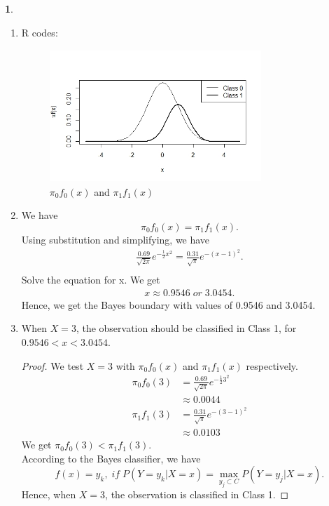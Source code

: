\documentclass[10pt]{article}
\newtheorem{prob}{\bm{$Problem$}}
\begin{document}
\begin{prob}
\end{prob}
\begin{enumerate}[1)]
\vspace{3mm}

\item
R codes:

\begin{figure}[H]
  \centering
  \includegraphics[width=8cm,height=5cm]{p21a.jpeg}
  \caption{$\pi_0f_0(x)$ and $\pi_1f_1(x)$} %
\end{figure}

\item
We have
\begin{equation}
\pi_0f_0(x)=\pi_1f_1(x).
\end{equation}
Using substitution and simplifying, we have
\begin{align*}
\frac{0.69}{\sqrt{2\pi}}e^{-\frac{1}{2}x^2}=\frac{0.31}{\sqrt{\pi}}e^{-(x-1)^2}.\\
\end{align*}
Solve the equation for x. We get
\begin{align*}
x\approx0.9546\;or\;3.0454.
\end{align*}
Hence, we get the Bayes boundary with values of 0.9546 and 3.0454.
\vspace{3mm}

\item
When $X=3$, the observation should be classified in Class 1, for $0.9546<x<3.0454$.
\begin{proof}
We test $X=3$ with $\pi_0f_0(x)$ and $\pi_1f_1(x)$ respectively.
\begin{align*}
\pi_0f_0(3)&=\frac{0.69}{\sqrt{2\pi}}e^{-\frac{1}{2}3^2}\\
&\approx0.0044\\
\pi_1f_1(3)&=\frac{0.31}{\sqrt{\pi}}e^{-(3-1)^2}\\
&\approx0.0103
\end{align*}
We get $\pi_0f_0(3)<\pi_1f_1(3)$.\\
According to the Bayes classifier, we have
\begin{equation}
f(x)=y_k,\;if\;P(Y=y_k|X=x)=\max_{y_j\subset C}P(Y=y_j|X=x).
\end{equation}
Hence, when $X=3$, the observation is classified in Class 1.
\end{proof}
\vspace{3mm}


\end{enumerate}
\end{document}
